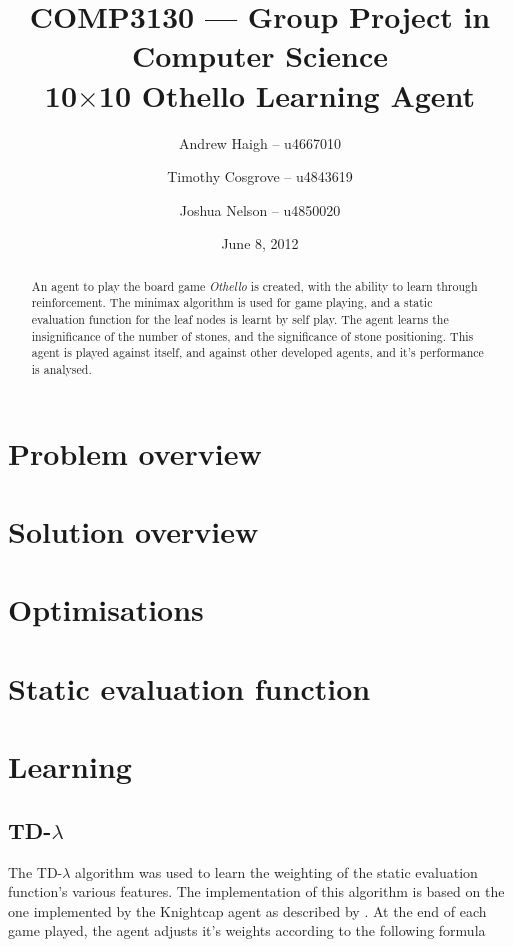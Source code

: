 \documentclass[11pt]{article}
\title{%
  COMP3130 --- Group Project in Computer Science \\
  10$\times$10 Othello Learning Agent}
\date{June 8, 2012}
\author{%
  Andrew Haigh -- u4667010 \and
  Timothy Cosgrove -- u4843619 \and
  Joshua Nelson -- u4850020}
\newcommand{\tdl}{TD-$\lambda$ }
\begin{document}
\maketitle
\begin{abstract}
An agent to play the board game \emph{Othello} is created, with the ability to learn through reinforcement. The minimax algorithm is used for game playing, and a static evaluation function for the leaf nodes is learnt by self play. The agent learns the insignificance of the number of stones, and the significance of stone positioning. This agent is played against itself, and against other developed agents, and it's performance is analysed.
\end{abstract}
\clearpage

\section{Problem overview}
\section{Solution overview}
\section{Optimisations}
\section{Static evaluation function}

\section{Learning}

\subsection{\tdl}

The \tdl algorithm was used to learn the weighting of the static evaluation
function's various features. The implementation of this algorithm is based on
the one implemented by the Knightcap agent as described by \citet{Baxter1997}.
At the end of each game played, the agent adjusts it's weights according to
the following formula
\end{document}
